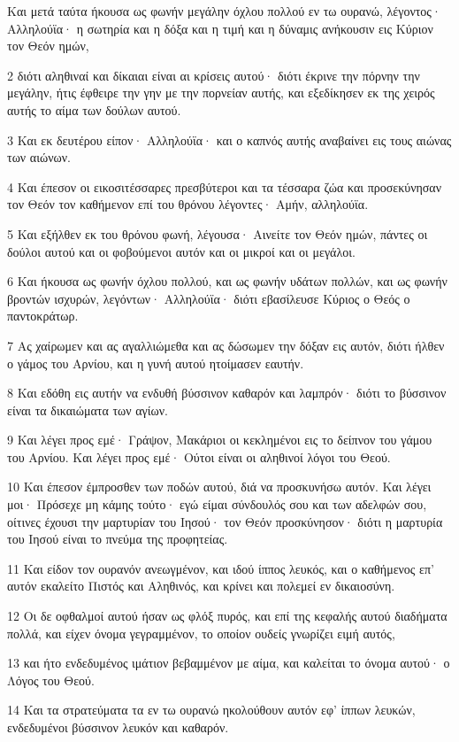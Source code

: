 \par Και μετά ταύτα ήκουσα ως φωνήν μεγάλην όχλου πολλού εν τω ουρανώ, λέγοντος· Αλληλούϊα· η σωτηρία και η δόξα και η τιμή και η δύναμις ανήκουσιν εις Κύριον τον Θεόν ημών,
\par 2 διότι αληθιναί και δίκαιαι είναι αι κρίσεις αυτού· διότι έκρινε την πόρνην την μεγάλην, ήτις έφθειρε την γην με την πορνείαν αυτής, και εξεδίκησεν εκ της χειρός αυτής το αίμα των δούλων αυτού.
\par 3 Και εκ δευτέρου είπον· Αλληλούϊα· και ο καπνός αυτής αναβαίνει εις τους αιώνας των αιώνων.
\par 4 Και έπεσον οι εικοσιτέσσαρες πρεσβύτεροι και τα τέσσαρα ζώα και προσεκύνησαν τον Θεόν τον καθήμενον επί του θρόνου λέγοντες· Αμήν, αλληλούϊα.
\par 5 Και εξήλθεν εκ του θρόνου φωνή, λέγουσα· Αινείτε τον Θεόν ημών, πάντες οι δούλοι αυτού και οι φοβούμενοι αυτόν και οι μικροί και οι μεγάλοι.
\par 6 Και ήκουσα ως φωνήν όχλου πολλού, και ως φωνήν υδάτων πολλών, και ως φωνήν βροντών ισχυρών, λεγόντων· Αλληλούϊα· διότι εβασίλευσε Κύριος ο Θεός ο παντοκράτωρ.
\par 7 Ας χαίρωμεν και ας αγαλλιώμεθα και ας δώσωμεν την δόξαν εις αυτόν, διότι ήλθεν ο γάμος του Αρνίου, και η γυνή αυτού ητοίμασεν εαυτήν.
\par 8 Και εδόθη εις αυτήν να ενδυθή βύσσινον καθαρόν και λαμπρόν· διότι το βύσσινον είναι τα δικαιώματα των αγίων.
\par 9 Και λέγει προς εμέ· Γράψον, Μακάριοι οι κεκλημένοι εις το δείπνον του γάμου του Αρνίου. Και λέγει προς εμέ· Ούτοι είναι οι αληθινοί λόγοι του Θεού.
\par 10 Και έπεσον έμπροσθεν των ποδών αυτού, διά να προσκυνήσω αυτόν. Και λέγει μοι· Πρόσεχε μη κάμης τούτο· εγώ είμαι σύνδουλός σου και των αδελφών σου, οίτινες έχουσι την μαρτυρίαν του Ιησού· τον Θεόν προσκύνησον· διότι η μαρτυρία του Ιησού είναι το πνεύμα της προφητείας.
\par 11 Και είδον τον ουρανόν ανεωγμένον, και ιδού ίππος λευκός, και ο καθήμενος επ' αυτόν εκαλείτο Πιστός και Αληθινός, και κρίνει και πολεμεί εν δικαιοσύνη.
\par 12 Οι δε οφθαλμοί αυτού ήσαν ως φλόξ πυρός, και επί της κεφαλής αυτού διαδήματα πολλά, και είχεν όνομα γεγραμμένον, το οποίον ουδείς γνωρίζει ειμή αυτός,
\par 13 και ήτο ενδεδυμένος ιμάτιον βεβαμμένον με αίμα, και καλείται το όνομα αυτού· ο Λόγος του Θεού.
\par 14 Και τα στρατεύματα τα εν τω ουρανώ ηκολούθουν αυτόν εφ' ίππων λευκών, ενδεδυμένοι βύσσινον λευκόν και καθαρόν.
